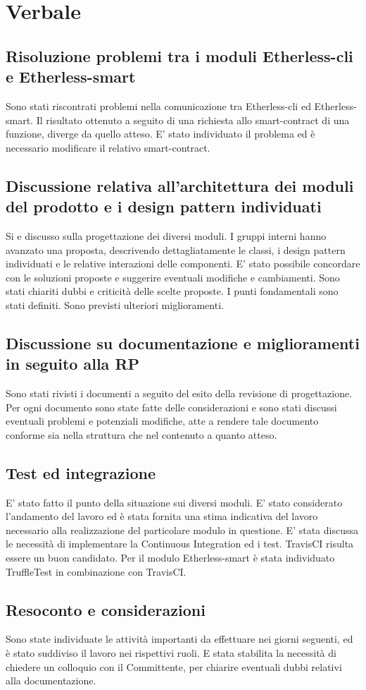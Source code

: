 \section{Verbale}
	\subsection{Risoluzione problemi tra i moduli Etherless-cli e Etherless-smart}
	 Sono stati riscontrati problemi nella comunicazione tra Etherless-cli ed Etherless-smart. Il risultato ottenuto a seguito di una richiesta allo smart-contract di una funzione, diverge da quello atteso. E' stato individuato il problema ed è necessario modificare il relativo smart-contract.
	\subsection{Discussione relativa all'architettura dei moduli del prodotto e i design pattern individuati}
	Si e discusso sulla progettazione dei diversi moduli. I gruppi interni hanno avanzato una proposta, descrivendo dettagliatamente le classi, i design pattern individuati e le relative interazioni delle componenti. E' stato possibile concordare con le soluzioni proposte e suggerire eventuali modifiche e cambiamenti. Sono stati chiariti dubbi e criticità delle scelte proposte. I punti fondamentali sono stati definiti. Sono previsti ulteriori miglioramenti.
	\subsection{Discussione su documentazione e miglioramenti in seguito alla RP}
	Sono stati rivisti i documenti a seguito del esito della revisione di progettazione. Per ogni documento sono state fatte delle considerazioni e sono stati discussi eventuali problemi e potenziali modifiche, atte a rendere tale documento conforme sia nella struttura che nel contenuto a quanto atteso.
	\subsection{Test ed integrazione}
	E’ stato fatto il punto della situazione sui diversi moduli. E' stato considerato l’andamento del lavoro ed è stata fornita una stima indicativa del lavoro necessario alla realizzazione del particolare modulo in questione. E’ stata discussa le necessità di implementare la Continuous Integration ed i test. TravisCI risulta essere un buon candidato. Per il modulo Etherless-smart è stata individuato TruffleTest in combinazione con TravisCI.
	\subsection{Resoconto e considerazioni}
	Sono state individuate le attività importanti da effettuare nei giorni seguenti, ed è stato suddiviso il lavoro nei rispettivi ruoli. E stata stabilita la necessità di chiedere un colloquio con il Committente, per chiarire eventuali dubbi relativi alla documentazione.